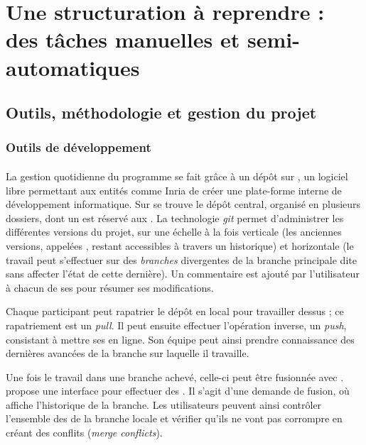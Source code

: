 \part{Une structuration à reprendre : des tâches manuelles et semi-automatiques}

\clearpage
\thispagestyle{empty}
\cleardoublepage

\chapter{Outils, méthodologie et gestion du projet}


\section{Outils de développement}

\subsection{\gitlab}

La gestion quotidienne du programme \timeus{} se fait grâce à un dépôt sur \gitlab{}, un logiciel libre permettant aux entités comme Inria de créer une plate-forme interne de développement informatique. Sur \gitlab{} se trouve le dépôt central, organisé en plusieurs dossiers, dont un est réservé aux \odm. La technologie \textit{git} permet d'administrer les différentes versions du projet, sur une échelle à la fois verticale (les anciennes versions, appelées \commits, restant accessibles à travers un historique) et horizontale (le travail peut s'effectuer sur des \textit{branches} divergentes de la branche principale dite \master{} sans affecter l'état de cette dernière). Un commentaire est ajouté par l'utilisateur à chacun de ses \commits{} pour résumer ses modifications.

Chaque participant peut rapatrier le dépôt \gitlab{} en local pour travailler dessus ; ce rapatriement est un \textit{pull}. Il peut ensuite effectuer l'opération inverse, un \textit{push}, consistant à mettre ses \commits{} en ligne. Son équipe peut ainsi prendre connaissance des dernières avancées de la branche sur laquelle il travaille.

Une fois le travail dans une branche achevé, celle-ci peut être fusionnée avec \master. \gitlab{} propose une interface pour effectuer des \mergerequests{}. Il s'agit d'une demande de fusion, où \gitlab{} affiche l'historique de la branche. Les utilisateurs peuvent ainsi contrôler l'ensemble des \commits{} de la branche locale et vérifier qu'ils ne vont pas corrompre \master{} en créant des conflits (\textit{merge conflicts}).

